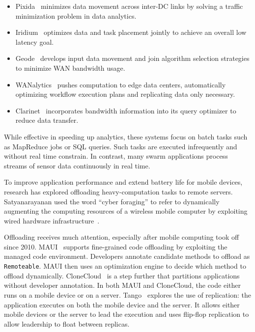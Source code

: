 \documentclass[thesis.tex]{subfiles}
\begin{document}
\begin{itemize}[topsep=5pt, leftmargin=20pt, itemsep=2pt]

\item Pixida~\cite{kloudas2015pixida} minimizes data movement across inter-DC
  links by solving a traffic minimization problem in data analytics.

\item Iridium~\cite{pu2015low} optimizes data and task placement jointly to
  achieve an overall low latency goal.

\item Geode~\cite{vulimiri2015global} develops input data movement and join
  algorithm selection strategies to minimize WAN bandwidth usage.

\item WANalytics~\cite{vulimiri2015wananlytics} pushes computation to edge data
  centers, automatically optimizing workflow execution plans and replicating
  data only necessary.

\item Clarinet~\cite{viswanathan2016clarinet} incorporates bandwidth information
  into its query optimizer to reduce data transfer.


\end{itemize}

While effective in speeding up analytics, these systems focus on batch tasks
such as MapReduce jobs or SQL queries. Such tasks are executed infrequently and
without real time constrain. In contrast, many swarm applications process
streams of sensor data continuously in real time.

 To improve application performance
and extend battery life for mobile devices, research has explored offloading
heavy-computation tasks to remote servers. Satyanarayanan used the word ``cyber
foraging'' to refer to dynamically augmenting the computing resources of a
wireless mobile computer by exploiting wired hardware
infrastructure~\cite{satyanarayanan2001pervasive, satyanarayanan2015brief}.

Offloading receives much attention, especially after mobile computing took off
since 2010. MAUI~\cite{cuervo2010maui} supports fine-grained code offloading by
exploiting the managed code environment. Developers annotate candidate methods
to offload as \texttt{Remoteable}. MAUI then uses an optimization engine to
decide which method to offload dynamically. CloneCloud~\cite{chun2011clonecloud}
is a step further that partitions applications without developer annotation. In
both MAUI and CloneCloud, the code either runs on a mobile device or on a
server. Tango~\cite{gordon2015accelerating} explores the use of replication: the
application executes on both the mobile device and the server. It allows either
mobile devices or the server to lead the execution and uses flip-flop
replication to allow leadership to float between replicas.
\end{document}
